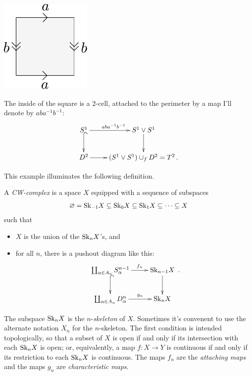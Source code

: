 \medskip
\begin{center}
\includegraphics[width=1.75in]{905/Figures/14-torus-CW-structure.pdf}
\end{center}

The inside of the square is a 2-cell, attached to the perimeter by a map I'll denote by $aba^{-1}b^{-1}$: 
\begin{equation*}
\xymatrix{S^1\ar[r]^{aba^{-1}b^{-1}}\ar@{^(->}[d] & S^1\vee S^1\ar[d]\\
D^2\ar[r] & (S^1\vee S^1)\cup_f D^2=T^2\,.
}\end{equation*}

This example illuminates the following definition.

\begin{definition}
A \emph{CW-complex} is a space $X$ equipped with a sequence of subspaces 
\[
\varnothing=\mathrm{Sk}_{-1}X\subseteq\mathrm{Sk}_0X\subseteq\mathrm{Sk}_1X\subseteq\cdots\subseteq X
\]
such that 
\begin{itemize}
\item $X$ is the union of the $\mathrm{Sk}_nX$'s, and 
\item for all $n$, there is a pushout diagram like this:
\begin{equation*}
\xymatrix{\coprod_{\alpha\in A_n}S^{n-1}_\alpha\ar[r]^-{f_n}\ar@{^(->}[d] 
& \Sk_{n-1}X\ar[d]\\
\coprod_{\alpha\in A_n}D^n_\alpha\ar[r]^-{g_n} & \Sk_nX}\,.
\end{equation*}
\end{itemize}
\end{definition}
The subspace $\mathrm{Sk}_nX$ is the $n$-{\em skeleton} of $X$. 
Sometimes it's convenent to use the alternate notation $X_n$ 
for the $n$-skeleton.
The first condition is intended topologically, so that a subset of $X$ is open if and only if its intersection with each $\mathrm{Sk}_nX$ is open; or, equivalently, a map $f:X\to Y$ is continuous if and only if its restriction to each $\mathrm{Sk}_nX$ is continuous. The maps $f_n$ are the {\em attaching maps} and the maps $g_n$ are {\em characteristic maps}. 

